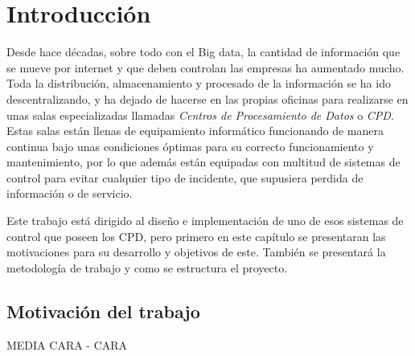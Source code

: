 \chapter{Introducción} 
\label{ch:introduccion}
Desde hace décadas, sobre todo con el Big data, la cantidad de información que se mueve por internet y que deben controlan las empresas ha aumentado mucho. \\ Toda la distribución, almacenamiento y procesado de la información se ha ido descentralizando, y ha dejado de hacerse en las propias oficinas para realizarse en unas salas especializadas llamadas \textit{Centros de Procesamiento de Datos} o \textit{CPD}. \\ Estas salas están llenas de equipamiento informático funcionando de manera continua bajo unas condiciones óptimas para su correcto funcionamiento y mantenimiento, por lo que además están equipadas con multitud de sistemas de control para evitar cualquier tipo de incidente, que supusiera perdida de información o de servicio.

Este trabajo está dirigido al diseño e implementación de uno de esos sistemas de control que poseen los CPD, pero primero en este capítulo se presentaran las motivaciones para su desarrollo y objetivos de este. También se presentará la metodología de trabajo y como se estructura el proyecto.

\section{Motivación del trabajo}
MEDIA CARA - CARA

